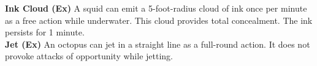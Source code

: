 \textbf{Ink Cloud (Ex)} A squid can emit a 5-foot-radius cloud of ink once per minute as a free action while underwater. This cloud provides total concealment. The ink persists for 1 minute. \\

\textbf{Jet (Ex)} An octopus can jet in a straight line as a full-round action. It does not provoke attacks of opportunity while jetting. \\

\newpage
